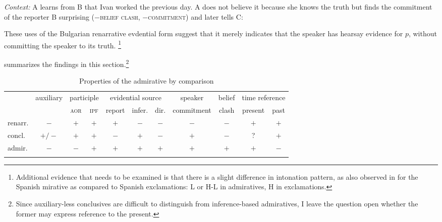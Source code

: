 \documentclass[output=paper,
colorlinks,
citecolor=brown,
newtxmath
]{langscibook}
\begin{document}
\eanoraggedright\label{ex:what-a-lie}
\textit{Context:} A learns from B that Ivan worked the previous day. A does not believe it because she knows the truth but finds the commitment of the reporter B surprising ($-$\textsc{belief clash}, $-$\textsc{commitment}) and later tells C:\vspace{-6pt}
\z
\begin{exe}
\end{exe}

\noindent These uses of the Bulgarian renarrative evdential form suggest that it merely indicates that the speaker has hearsay evidence for $p$, without committing the speaker to its truth.%
\footnote{Additional evidence that needs to be examined is that there is a slight difference in intonation pattern, as also observed in \citet[152--153]{Bustamante2013} for the Spanish mirative as compared to Spanish exclamations: L or H-L in admiratives, H in exclamations.}

 summarizes the findings in this section.\footnote{Since auxiliary-less conclusives are difficult to distinguish from inference-based admiratives, I leave the question open whether the former may express reference to the present.}

\begin{table}[h]
\centering
\small
\setlength\tabcolsep{3.4pt}
\caption{Properties of the admirative by comparison}
\label{properties-admir}
\begin{tabularx}{\textwidth}{lcccccccccc}
\lsptoprule
& \multirow{2}{*}{\small auxiliary} & \multicolumn{2}{c}{ \small{participle}} & \multicolumn{3}{c}{ \small{evidential source}} & \small{speaker} & \small{belief} & \multicolumn{2}{c}{ \small{time reference}}\\
& & \textsc{aor} &\textsc{ipf} & \small{report} & \small{infer.} & \small{dir.} & \small{commitment} & \small{clash}& \small{present} & \small{past}\\
 \midrule
renarr.& $-$ & $+$ & $+$ & $+$ & $-$ & $-$ & $-$ & $-$ & $+$ & $+$\smallskip\\
concl.& $+/-$ & $+$ & $+$ & $-$ & $+$ & $-$ & $+$ & $-$ & ? & $+$\smallskip\\
admir.& $-$ & $-$ & $+$ & $+$ & $+$ & $+$ & $+$ & $+$ & $+$ & $-$ \\
 \lspbottomrule
\end{tabularx}
\end{table}
\end{document}

